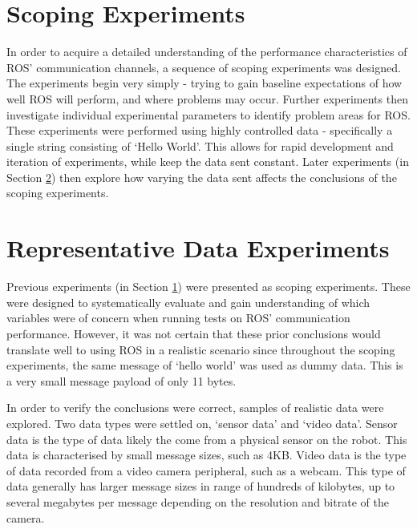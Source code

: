 \documentclass{l4proj}
\begin{document}
\section{Scoping Experiments}
\label{communication-scoping-experiments}

In order to acquire a detailed understanding of the performance characteristics of ROS' communication channels, a sequence of scoping experiments was designed. The experiments begin very simply - trying to gain baseline expectations of how well ROS will perform, and where problems may occur. Further experiments then investigate individual experimental parameters to identify problem areas for ROS. These experiments were performed using highly controlled data - specifically a single string consisting of `Hello World'. This allows for rapid development and iteration of experiments, while keep the data sent constant. Later experiments (in Section \ref{communication-real-data}) then explore how varying the data sent affects the conclusions of the scoping experiments.









\section{Representative Data Experiments}
\label{communication-real-data}

Previous experiments (in Section \ref{communication-scoping-experiments}) were presented as scoping experiments. These were designed to systematically evaluate and gain understanding of which variables were of concern when running tests on ROS' communication performance. However, it was not certain that these prior conclusions would translate well to using ROS in a realistic scenario since throughout the scoping experiments, the same message of `hello world' was used as dummy data. This is a very small message payload of only 11 bytes.

In order to verify the conclusions were correct, samples of realistic data were explored. Two data types were settled on, `sensor data' and `video data'. Sensor data is the type of data likely the come from a physical sensor on the robot. This data is characterised by small message sizes, such as 4KB. Video data is the type of data recorded from a video camera peripheral, such as a webcam. This type of data generally has larger message sizes in range of hundreds of kilobytes, up to several megabytes per message depending on the resolution and bitrate of the camera.
\end{document}
